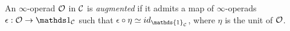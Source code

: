 



\begin{definition}
	An $\infty$-operad ${\mathcal{O}}$ in ${\mathcal{C}}$ is \emph{augmented} if it admits a map of $\infty$-operads $\epsilon:\CO\rightarrow \triv_{\CC}$ such that $\epsilon\circ \eta\simeq id_{\mathds{1}_\CC}$, where $\eta$ is the unit of ${\mathcal{O}}$. 

\end{definition}


